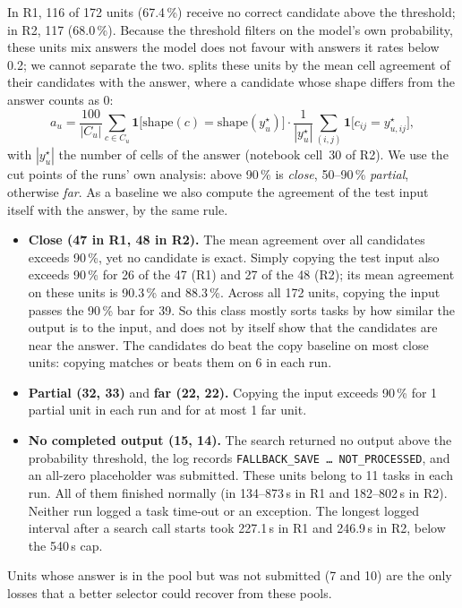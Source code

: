 \documentclass[11pt]{article}
\newcommand{\code}[1]{\texttt{#1}}
\newcommand{\R}[1]{R#1}
\begin{document}
In \R{1}, 116 of 172 units (67.4\,\%) receive no correct candidate above the threshold; in \R{2}, 117 (68.0\,\%). Because the threshold filters on the model's own probability, these units mix answers the model does not favour with answers it rates below 0.2; we cannot separate the two.
 splits these units by the mean cell agreement of their candidates with the answer, where a candidate whose shape differs from the answer counts as 0:
\begin{equation}
\label{eq:agree}
a_u = \frac{100}{|C_u|} \sum_{c \in C_u} \mathbf{1}\big[\mathrm{shape}(c) = \mathrm{shape}(y^\star_u)\big] \cdot \frac{1}{|y^\star_u|} \sum_{(i,j)} \mathbf{1}\big[c_{ij} = y^\star_{u,ij}\big] ,
\end{equation}
with $|y^\star_u|$ the number of cells of the answer (notebook cell~30 of \R{2}). We use the cut points of the runs' own analysis: above 90\,\% is \emph{close}, 50--90\,\% \emph{partial}, otherwise \emph{far}.
As a baseline we also compute the agreement of the test input itself with the answer, by the same rule.
\begin{itemize}
\item \textbf{Close (47 in \R{1}, 48 in \R{2}).} The mean agreement over all candidates exceeds 90\,\%, yet no candidate is exact. Simply copying the test input also exceeds 90\,\% for 26 of the 47 (\R{1}) and 27 of the 48 (\R{2}); its mean agreement on these units is 90.3\,\% and 88.3\,\%. Across all 172 units, copying the input passes the 90\,\% bar for 39. So this class mostly sorts tasks by how similar the output is to the input, and does not by itself show that the candidates are near the answer. The candidates do beat the copy baseline on most close units: copying matches or beats them on 6 in each run.
\item \textbf{Partial (32, 33)} and \textbf{far (22, 22).} Copying the input exceeds 90\,\% for 1 partial unit in each run and for at most 1 far unit.
\item \textbf{No completed output (15, 14).} The search returned no output above the probability threshold, the log records \code{FALLBACK\_SAVE \ldots{} NOT\_PROCESSED}, and an all-zero placeholder was submitted. These units belong to 11 tasks in each run. All of them finished normally (in 134--873\,s in \R{1} and 182--802\,s in \R{2}). Neither run logged a task time-out or an exception. The longest logged interval after a search call starts took 227.1\,s in \R{1} and 246.9\,s in \R{2}, below the 540\,s cap.
\end{itemize}
Units whose answer is in the pool but was not submitted (7 and 10) are the only losses that a better selector could recover from these pools.
\end{document}
